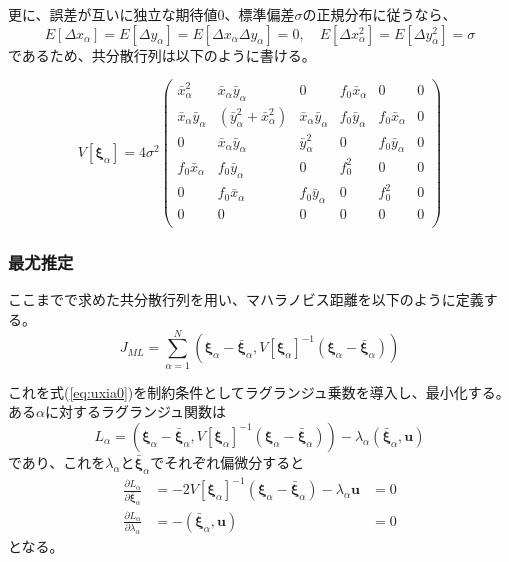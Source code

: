 \documentclass[12pt,a4j]{jsarticle}
\newcommand{\bxa}{\bar{x}_\alpha}
\newcommand{\dxa}{\Delta x_\alpha}
\newcommand{\bya}{\bar{y}_\alpha}
\newcommand{\dya}{\Delta y_\alpha}
\newcommand{\xia}{\bm{\xi}_\alpha}
\newcommand{\bxia}{\bar{\bm{\xi}}_\alpha}
\begin{document}
      更に、誤差が互いに独立な期待値$0$、標準偏差$\sigma$の正規分布に従うなら、
      \begin{equation}
        E[\dxa] = E[\dya] = E[\dxa\dya] = 0, \quad E[\dxa^2] = E[\dya^2] = \sigma
      \end{equation}
      であるため、共分散行列は以下のように書ける。

      \begin{equation}
        V[\xia] = 4 \sigma^2 \begin{pmatrix}
          \bxa^2 & \bxa\bya & 0 & f_0\bxa & 0 & 0 \\
          \bxa\bya & (\bya^2 + \bxa^2) & \bxa\bya & f_0\bya & f_0\bxa & 0 \\
          0 & \bxa\bya & \bya^2 & 0 & f_0\bya & 0 \\
          f_0\bxa & f_0\bya & 0 & f_0^2 & 0 & 0 \\
          0 & f_0\bxa & f_0\bya & 0 & f_0^2 & 0 \\
          0 & 0 & 0 & 0 & 0 & 0 \\
        \end{pmatrix}
      \end{equation}
    
    \subsubsection*{最尤推定}
      ここまでで求めた共分散行列を用い、マハラノビス距離を以下のように定義する。
      \begin{equation}
        J_{ML} = \sum_{\alpha = 1}^N \left(\xia - \bxia, V[\xia]^{-1} (\xia - \bxia) \right) \label{eq:JML}
      \end{equation}
      
      これを式(\ref{eq:uxia0})を制約条件としてラグランジュ乗数を導入し、最小化する。
      ある$\alpha$に対するラグランジュ関数は
      \begin{equation}
        L_\alpha = \left(\xia - \bxia, V[\xia]^{-1} (\xia - \bxia)\right) - \lambda_\alpha (\bxia, \bm{u})
      \end{equation}
      であり、これを$\lambda_\alpha$と$\bxia$でそれぞれ偏微分すると
      \begin{align}
        \frac{\partial L_\alpha}{\partial \bxia} &= -2V[\xia]^{-1}(\xia - \bxia) - \lambda_\alpha\bm{u} &= 0 \label{eq:partbxia} \\
        \frac{\partial L_\alpha}{\partial \lambda_\alpha} &= -(\bxia, \bm{u}) &= 0 \label{eq:partlambda}
      \end{align}
      となる。
\end{document}
